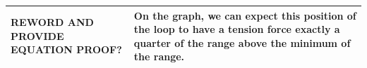 \documentclass[11pt, a4paper]{article}
\begin{document}
\begin{table}[H]
\begin{tabularx}{\textwidth}{|>{\raggedright\arraybackslash}X|||>{\raggedright\arraybackslash}X|}
			\vspace{\baselineskip}
			REWORD AND PROVIDE EQUATION PROOF?
			&
			On the graph, we can expect this position of the loop to have a tension force exactly a quarter of the range above the minimum of the range. \\
			\hline
		\end{tabularx}
	\end{table}
	
	
\end{document}
